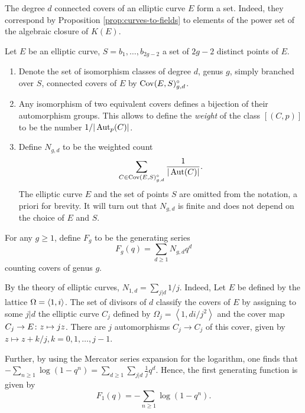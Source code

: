 \begin{rmk}
 The degree $d$ connected covers of an elliptic curve $E$ form a set. Indeed, they correspond by Proposition \ref{prop:curves-to-fields} to elements of the power set of the algebraic closure of $K(E)$.
\end{rmk}

\begin{defi} Let $E$ be an elliptic curve, $S={b_1,\dotsc,b_{2g-2}}$ a set of $2g-2$ distinct points of $E$.
 \begin{enumerate}
  \item Denote the set of isomorphism classes of degree $d$, genus $g$, simply branched over $S$, connected covers of $E$ by $\operatorname{Cov}(E,S)^{\circ}_{g,d}$.
  
  \item Any isomorphism of two equivalent covers defines a bijection of their automorphism groups. This allows to define the \emph{weight} of the class $[(C,p)]$ to be the number $1/|\operatorname{Aut}_p(C)|$.
  
  \item Define $N_{g,d}$ to be the weighted count \[\sum_{C\in \operatorname{Cov}(E,S)^{\circ}_{g,d}} \frac{1}{|\operatorname{Aut}(C)|}.\] The elliptic curve $E$ and the set of points $S$ are omitted from the notation, a priori for brevity. It will turn out that $N_{g,d}$ is finite and does not depend on the choice of $E$ and $S$.
 \end{enumerate}
\end{defi}

\begin{defi}
 For any $g\geq 1$, define $F_g$ to be the generating series \[F_g(q)=\sum_{d\geq 1}N_{g,d}q^d\] counting covers of genus $g$.
\end{defi}

\begin{expl}
 By the theory of elliptic curves, $N_{1,d}=\sum_{j|d}1/j$. Indeed, Let $E$ be defined by the lattice $\Omega=\left\langle 1,i \right\rangle$. The set of divisors of $d$ classify the covers of $E$ by assigning to some $j|d$ the elliptic curve $C_j$ defined by $\Omega_j=\left<1,di/j^2\right>$ and the cover map $C_j\to E\colon z\mapsto jz$. There are $j$ automorphisms $C_j\to C_j$ of this cover, given by $z\mapsto z+k/j, k=0,1,\dotsc,j-1$.
 
 Further, by using the Mercator series expansion for the logarithm, one finds that $-\sum_{n\geq 1}\log(1-q^n)=\sum_{d\geq 1}\sum_{j|d}\frac{1}{j}q^d.$
 Hence, the first generating function is given by \[F_1(q)=-\sum_{n\geq 1}\log(1-q^n).\]
\end{expl}

